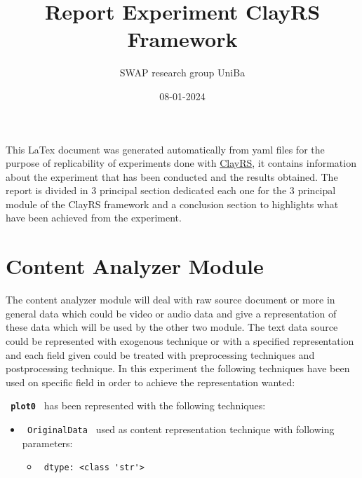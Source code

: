\documentclass[11pt]{article}
\title{Report Experiment ClayRS Framework}
\author{SWAP research group UniBa}
\date{08-01-2024}
\begin{document}
\maketitle
This LaTex document was generated automatically from yaml files for the purpose of replicability of experiments done with
\href{https://github.com/swapUniba/ClayRS}{ClayRS},
it contains information about the experiment that has been conducted and the results obtained.
The report is divided in 3 principal section dedicated each one for the 3 principal module of the ClayRS framework
and a conclusion section to highlights what have been achieved from the experiment.
\hfill\break
\hfill\break



\section{Content Analyzer Module}\label{sec:ca}
The content analyzer module will deal with raw source document or more in general data which could be
video or audio data and give a representation of these data which will be used by the other two module.
The text data source could be represented with exogenous technique or with a specified representation
and each field given could be treated with preprocessing techniques and postprocessing technique.
In this experiment the following techniques have been used on specific field in order to achieve the
representation wanted:
\hfill\break
\hfill\break



\textbf{\lstinline[style=verbatim-text]| plot0 |} has been represented with the following techniques:
\hfill\break
\hfill\break

\begin{itemize}
                                                            
            \item
        \verb| OriginalData | used as content representation technique with following parameters:
        \begin{itemize}
                            \item
                \verb| dtype: <class 'str'>|
                    \end{itemize}
    \end{itemize}
\hfill\break
\hfill\break
\end{document}
